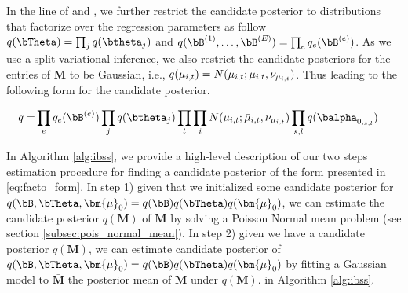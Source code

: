 In the line of  \cite{kim_flexible_2022} and \cite{wang_simple_2020}, we  further restrict the candidate posterior to distributions that factorize over the regression parameters as follow  $q(\bTheta)=\prod_j q(\btheta_j)$ and $q(\bB^{(1)},\ldots,\bB^{(E)})= \prod_e q_e(\bB^{(e)})  $. As we use a split variational inference, we also  restrict the  candidate posteriors for the entries of $\bm{M}$ to be Gaussian, i.e., $q( \mu_{i,t}) =  N( \mu_{i,t}; \Bar{\mu}_{i,t} ,  \nu _{\mu_{i,t}}) $. Thus leading to the following form for the candidate posterior.



\begin{align} \label{eq:facto_form}
    q=&\prod_e q_e(\bB^{(e)}) \prod_j q(\btheta_j) \prod_t\prod_i N(\mu_{i,t};\Bar{\mu}_{i,t},\nu_{\mu_{i,t}}) \prod_{s,l} q(\balpha_{0,_{s,l}})
\end{align}

In Algorithm \ref{alg:ibss},  we provide a high-level description of our two steps estimation procedure  for finding a candidate posterior of the form presented in \ref{eq:facto_form}.  In step  1) given that we initialized some candidate posterior for $q(\bB, \bTheta,\bm{\mu}_0)= q( \bB )q(\bTheta)  q(\bm{\mu}_0)$, we can estimate the candidate posterior $q(\mathbf{  M } ) $ of  $\mathbf{  M } $ by solving a Poisson Normal mean problem (see section \ref{subsec:pois_normal_mean}). In step 2)  given we have a  candidate posterior $q(\mathbf{  M } ) $, we can estimate candidate posterior of  $q(\bB, \bTheta,\bm{\mu}_0) =q( \bB )q(\bTheta)  q(\bm{\mu}_0)$  by fitting a Gaussian model to   $  \bar{\mathbf{  M }}$ the posterior mean of $   \mathbf{  M } $ under  $q(\mathbf{  M } ) $. in Algorithm \ref{alg:ibss}.  
 

 


